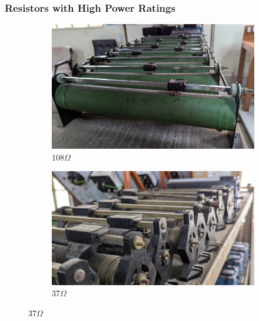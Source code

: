 \documentclass[a4paper,12pt]{article}
\begin{document}
	\subsubsection{Resistors with High Power Ratings}
	
	\begin{figure}[H]
		\centering
		\begin{subfigure}[t]{0.49\textwidth}
			\centering
				\includegraphics[width=1\linewidth]{Images/5}
			\caption{108$\Omega$}
		\end{subfigure}
		\hfill
		\begin{subfigure}[t]{0.49\textwidth}
			\centering
				\includegraphics[width=1\linewidth]{Images/6}
			\caption{37$\Omega$}
		\end{subfigure}
	

\end{figure}
\end{document}
